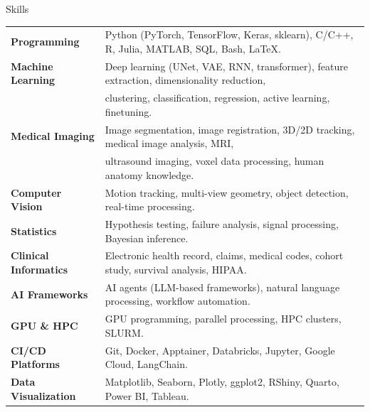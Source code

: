 \documentclass{resume} %
\begin{document}
\begin{rSection}{Skills}
\begin{tabular}{ @{} >{\bfseries}l @{\hspace{3ex}} l }
Programming & Python (PyTorch, TensorFlow, Keras, sklearn), C/C++, R, Julia, MATLAB, SQL, Bash, LaTeX. \\
Machine Learning & Deep learning (UNet, VAE, RNN, transformer), feature extraction, dimensionality reduction, \\
& clustering, classification, regression, active learning, finetuning. \\
Medical Imaging & Image segmentation, image registration, 3D/2D tracking, medical image analysis, MRI, \\
& ultrasound imaging, voxel data processing, human anatomy knowledge. \\
Computer Vision & Motion tracking, multi-view geometry, object detection, real-time processing. \\
Statistics & Hypothesis testing, failure analysis, signal processing, Bayesian inference. \\
Clinical Informatics & Electronic health record, claims, medical codes, cohort study, survival analysis, HIPAA. \\
AI Frameworks & AI agents (LLM-based frameworks), natural language processing, workflow automation. \\
GPU \& HPC & GPU programming, parallel processing, HPC clusters, SLURM. \\
CI/CD Platforms & Git, Docker, Apptainer, Databricks, Jupyter, Google Cloud, LangChain. \\
Data Visualization & Matplotlib, Seaborn, Plotly, ggplot2, RShiny, Quarto, Power BI, Tableau. \\
\end{tabular}
\end{rSection}
\end{document}
